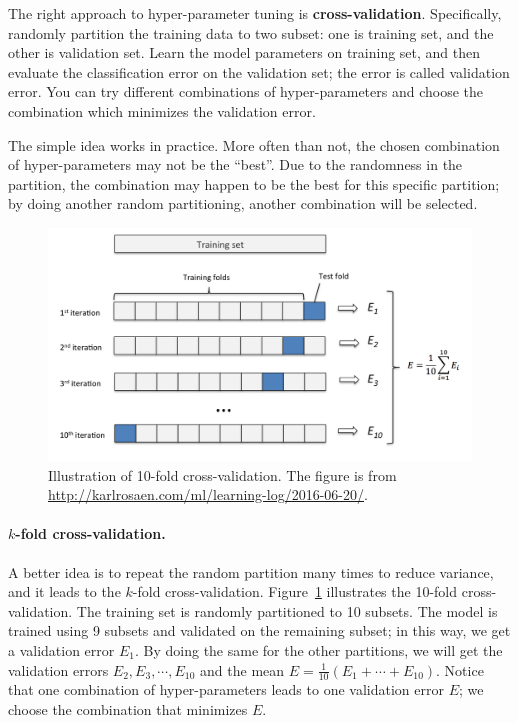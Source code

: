 \documentclass[11pt]{article}
\numberwithin{equation}{section}
\begin{document}
The right approach to hyper-parameter tuning is {\bf cross-validation}.
Specifically, randomly partition the training data to two subset: one is training set, and the other is validation set.
Learn the model parameters on training set, 
and then evaluate the classification error on the validation set;
the error is called validation error.
You can try different combinations of hyper-parameters and choose the combination which minimizes the validation error.



The simple idea works in practice.
More often than not, the chosen combination of hyper-parameters may not be the ``best''.
Due to the randomness in the partition, the combination may happen to be the best for this specific partition;
by doing another random partitioning, another combination will be selected.






\begin{figure}[!h]
	\centering
	\includegraphics[width=0.8\linewidth]{figures/cv.png}
	\caption{Illustration of 10-fold cross-validation.
		The figure is from \url{http://karlrosaen.com/ml/learning-log/2016-06-20/}.}
	\label{fig:cv}
\end{figure}

\paragraph{$k$-fold cross-validation.}
A better idea is to repeat the random partition many times to reduce variance,
and it leads to the $k$-fold cross-validation.
Figure~\ref{fig:cv} illustrates the 10-fold cross-validation.
The training set is randomly partitioned to 10 subsets.
The model is trained using 9 subsets and validated on the remaining subset;
in this way, we get a validation error $E_1$.
By doing the same for the other partitions, we will get the validation errors $E_2, E_3, \cdots , E_{10}$
and the mean $E = \frac{1}{10} ( E_1 + \cdots + E_{10})$.
Notice that one combination of hyper-parameters leads to one validation error $E$;
we choose the combination that minimizes $E$.
\end{document}
